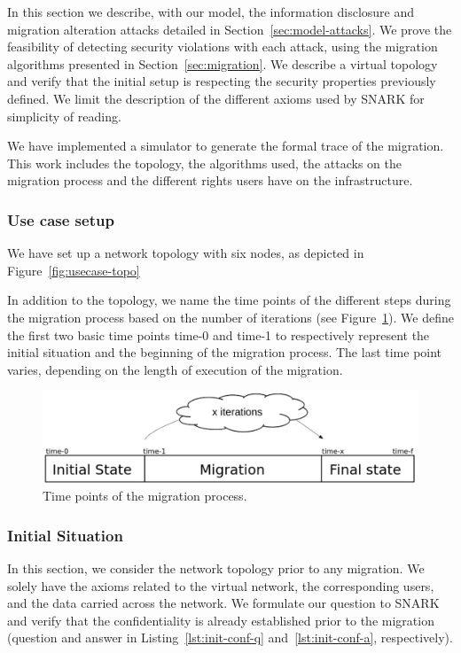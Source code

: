 \label{sec:model-usecase}
In this section we describe, with our model, the information disclosure and migration alteration attacks detailed in Section~\ref{sec:model-attacks}.
We prove the feasibility of detecting security violations with each attack, using the migration algorithms presented in Section~\ref{sec:migration}.
We describe a virtual topology and verify that the initial setup is respecting the security properties previously defined.
We limit the description of the different axioms used by SNARK for simplicity of reading.

We have implemented a simulator to generate the formal trace of the migration.
This work includes the topology, the algorithms used, the attacks on the migration process and the different rights users have on the infrastructure.

\subsubsection{Use case setup}
We have set up a network topology with six nodes, as depicted in Figure~\ref{fig:usecase-topo}




In addition to the topology, we name the time points of the different steps during the migration process based on the number of iterations (see Figure~\ref{fig:time-points}).
We define the first two basic time points time-0 and time-1 to respectively represent the initial situation and the beginning of the migration process. The last time point varies, depending on the length of execution of the migration.


\begin{figure}[htbp]
\centering
\includegraphics[scale=0.5]{figures/time-points-evolution} 
\caption{Time points of the migration process.\label{fig:time-points}}
\end{figure}

\subsubsection{Initial Situation}
In this section, we consider the network topology prior to any migration.
We solely have the axioms related to the virtual network, the corresponding users, and the data carried across the network.
We formulate our question to SNARK and verify that the confidentiality is already established prior to the migration (question and answer in Listing~\ref{lst:init-conf-q} and~\ref{lst:init-conf-a}, respectively).



